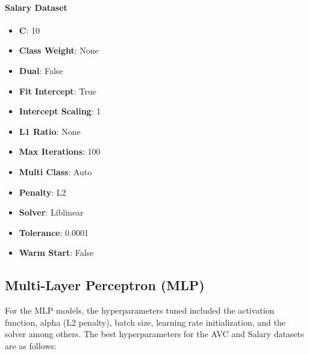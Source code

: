 \documentclass[a4paper,12pt]{article}
\begin{document}
\paragraph{Salary Dataset}
\begin{itemize}
    \item \textbf{C}: 10
    \item \textbf{Class Weight}: None
    \item \textbf{Dual}: False
    \item \textbf{Fit Intercept}: True
    \item \textbf{Intercept Scaling}: 1
    \item \textbf{L1 Ratio}: None
    \item \textbf{Max Iterations}: 100
    \item \textbf{Multi Class}: Auto
    \item \textbf{Penalty}: L2
    \item \textbf{Solver}: Liblinear
    \item \textbf{Tolerance}: 0.0001
    \item \textbf{Warm Start}: False
\end{itemize}

\subsection{Multi-Layer Perceptron (MLP)}
For the MLP models, the hyperparameters tuned included the activation function, alpha (L2 penalty), batch size, learning rate initialization, and the solver among others. The best hyperparameters for the AVC and Salary datasets are as follows:
\end{document}

